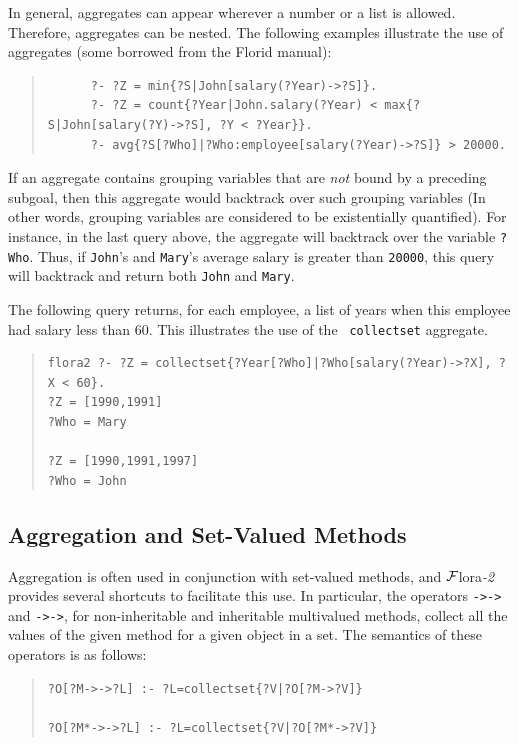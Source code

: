 \documentclass[11pt]{article}
\newcommand{\FLORA}{{\mbox{\sc ${\cal F}${lora}\rm\emph{-2}}}\xspace}
\newcommand{\FLORID}{{\mbox{\sc Florid}}\xspace}
\begin{document}
In general, aggregates can appear wherever a number or a list is
allowed. Therefore, aggregates can be nested. The following examples
illustrate the use of aggregates (some borrowed from the \FLORID manual):
\begin{quote}
\begin{verbatim}
      ?- ?Z = min{?S|John[salary(?Year)->?S]}.
      ?- ?Z = count{?Year|John.salary(?Year) < max{?S|John[salary(?Y)->?S], ?Y < ?Year}}.
      ?- avg{?S[?Who]|?Who:employee[salary(?Year)->?S]} > 20000. 
\end{verbatim}
\end{quote}
If an aggregate contains grouping variables that are \emph{not} bound
by a preceding subgoal, then this aggregate would backtrack over such
grouping variables (In other words, grouping variables are considered to be
existentially quantified). For instance, in the last query above, the
aggregate will backtrack over the variable {\tt ?Who}. Thus, if
{\tt John}'s and {\tt Mary}'s average salary is greater than {\tt 20000},
this query will backtrack and return both {\tt John} and {\tt Mary}.

The following query returns, for each employee, a list of years when this
employee had salary less than 60. This illustrates the use of the {\tt
  collectset} aggregate.
\begin{quote}
\begin{verbatim}
flora2 ?- ?Z = collectset{?Year[?Who]|?Who[salary(?Year)->?X], ?X < 60}.
?Z = [1990,1991]
?Who = Mary

?Z = [1990,1991,1997]
?Who = John
\end{verbatim}
\end{quote}

\subsection {Aggregation and Set-Valued Methods}

\index{{\tt ->->}}
\index{{\tt *->->}}
Aggregation is often used in conjunction with set-valued methods, and
\FLORA provides several shortcuts to facilitate this use.
In particular, the operators
{\tt ->->} and {\tt *->->}, for non-inheritable and
inheritable multivalued methods, collect all the values of the given
method for a given object in a set. The semantics of these operators is
as follows:

\begin{quote}
\begin{verbatim}
?O[?M->->?L] :- ?L=collectset{?V|?O[?M->?V]}

?O[?M*->->?L] :- ?L=collectset{?V|?O[?M*->?V]}
\end{verbatim}
\end{quote}
\end{document}
